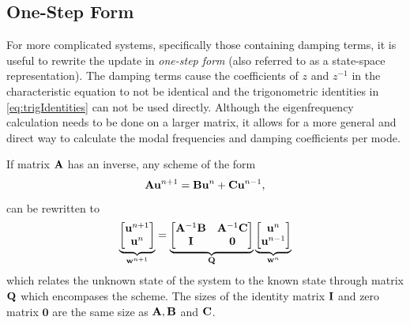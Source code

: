 {{\subsection{One-Step Form}\label{sec:oneStepForm}
For more complicated systems, specifically those containing damping terms, it is useful to rewrite the update in \textit{one-step form} (also referred to as a state-space representation). The damping terms cause the coefficients of $z$ and $z^{-1}$ in the characteristic equation to not be identical and the trigonometric identities in \eqref{eq:trigIdentities} can not be used directly. Although the eigenfrequency calculation needs to be done on a larger matrix, it allows for a more general and direct way to calculate the modal frequencies and damping coefficients per mode. 

If matrix $\mathbf{A}$ has an inverse, any scheme of the form
\begin{equation}\label{eq:modalForm}
    \mathbf{A}\mathbf{u}^{n+1}=\mathbf{B}\mathbf{u}^n + \mathbf{C}\mathbf{u}^{n-1},
\end{equation}
can be rewritten to
\begin{equation}\label{eq:oneStepForm}
    \underbrace{\begin{bmatrix}
        \mathbf{u}^{n+1}\\
        \mathbf{u}^n
    \end{bmatrix}}_{\mathbf{w}^{n+1}} = 
    \underbrace{\begin{bmatrix}
        \mathbf{A}^{-1}\mathbf{B} & \mathbf{A}^{-1}\mathbf{C}\\
        \mathbf{I} & \mathbf{0}
    \end{bmatrix}}_{\mathbf{Q}}
    \underbrace{\begin{bmatrix}
        \mathbf{u}^n\\
        \mathbf{u}^{n-1}
    \end{bmatrix}}_{\mathbf{w}^n}
\end{equation}
which relates the unknown state of the system to the known state through matrix $\mathbf{Q}$ which encompases the scheme. The sizes of the identity matrix $\mathbf{I}$ and zero matrix $\mathbf{0}$ are the same size as $\mathbf{A}, \mathbf{B}$ and $\mathbf{C}$.

}}
